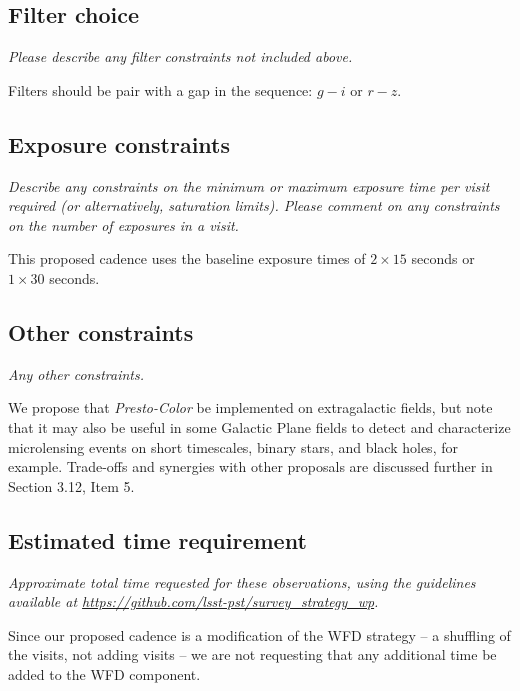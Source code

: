 \documentclass[12pt, letterpaper]{article}
\begin{document}
\subsection{Filter choice}
\begin{footnotesize}
{\it Please describe any filter constraints not included above.}
\end{footnotesize}

Filters should be pair with a gap in the sequence: $g-i$ or $r-z$.                                                       
\subsection{Exposure constraints}
\begin{footnotesize}
{\it Describe any constraints on the minimum or maximum exposure time per visit required (or alternatively, saturation limits). Please comment on any constraints on the number of exposures in a visit.}
\end{footnotesize}

This proposed cadence uses the baseline exposure times of $2\times15$ seconds or $1\times30$ seconds.

\subsection{Other constraints}
\begin{footnotesize}
{\it Any other constraints.}
\end{footnotesize}

We propose that {\em Presto-Color} be implemented on extragalactic fields, but note that it may also be useful in some Galactic Plane fields to detect and characterize microlensing events on short timescales, binary stars, and black holes, for example. Trade-offs and synergies with other proposals are discussed further in Section 3.12, Item 5.


\subsection{Estimated time requirement}
\begin{footnotesize}
{\it Approximate total time requested for these observations, using the guidelines available at \url{https://github.com/lsst-pst/survey_strategy_wp}.}
\end{footnotesize}

Since our proposed cadence is a modification of the WFD strategy -- a shuffling of the visits, not adding visits -- we are not requesting that any additional time be added to the WFD component.
\end{document}
